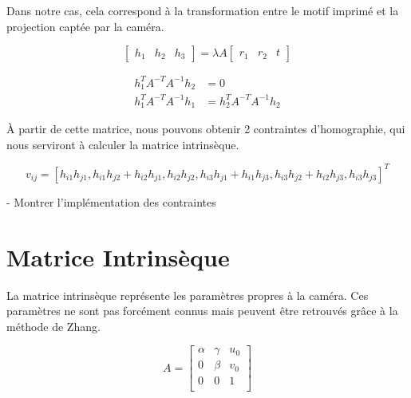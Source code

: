 \documentclass{article}
\begin{document}
Dans notre cas, cela correspond à la transformation entre le motif imprimé et la projection captée par la caméra.

\begin{equation}
  \begin{bmatrix}
    h_1 & h_2 & h_3
  \end{bmatrix}
  = \lambda A
  \begin{bmatrix}
    r_1 & r_2 & t
  \end{bmatrix}
\end{equation}

\begin{equation}
  \begin{aligned}
    h_1^T A^{-T} A^{-1} h_2 &= 0 \\
    h_1^T A^{-T} A^{-1} h_1 &= h_2^T A^{-T} A^{-1} h_2
  \end{aligned}
\end{equation}

À partir de cette matrice, nous pouvons obtenir 2 contraintes d'homographie, qui nous serviront à calculer la matrice intrinsèque.

\begin{equation}
  v_{ij} = [h_{i1} h_{j1} , h_{i1} h_{j2} + h_{i2} h_{j1} , h_{i2} h_{j2} ,
h_{i3} h_{j1} + h_{i1} h_{j3} , h_{i3} h_{j2} + h_{i2} h_{j3} , h_{i3} h_{j3} ]^T
\end{equation}

- Montrer l'implémentation des contraintes


\section{Matrice Intrinsèque}

La matrice intrinsèque représente les paramètres propres à la caméra. Ces paramètres ne sont pas forcément connus mais peuvent être retrouvés grâce à la méthode de Zhang.

\begin{equation}
  A=
  \begin{bmatrix}
   \alpha & \gamma & u_0 \\
   0 & \beta & v_0 \\
   0 & 0 & 1 \\
  \end{bmatrix}
\end{equation}
\end{document}
